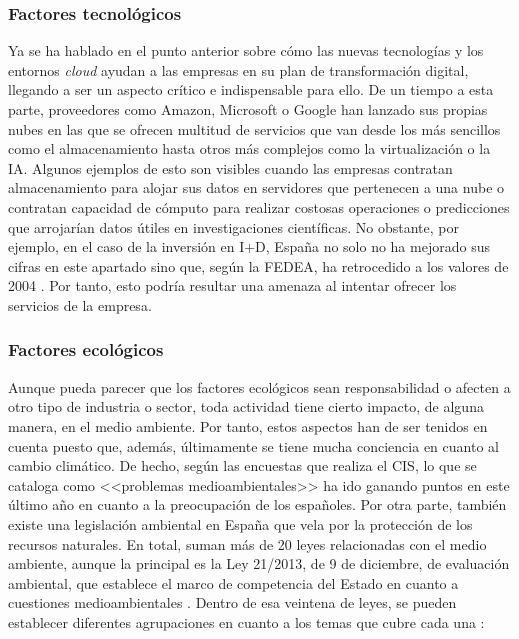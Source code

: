 \clearpage

\subsubsection{Factores tecnológicos}
Ya se ha hablado en el punto anterior sobre cómo las nuevas tecnologías y los entornos \textit{cloud} ayudan a las empresas en su plan de transformación digital, llegando a ser un aspecto crítico e indispensable para ello. De un tiempo a esta parte, proveedores como Amazon, Microsoft o Google han lanzado sus propias nubes en las que se ofrecen multitud de servicios que van desde los más sencillos como el almacenamiento hasta otros más complejos como la virtualización o la \acf{IA}. Algunos ejemplos de esto son visibles cuando las empresas contratan almacenamiento para alojar sus datos en servidores que pertenecen a una nube o contratan capacidad de cómputo para realizar costosas operaciones o predicciones que arrojarían datos útiles en investigaciones científicas. No obstante, por ejemplo, en el caso de la inversión en I+D, España no solo no ha mejorado sus cifras en este apartado sino que, según la \acf{FEDEA}, ha retrocedido a los valores de 2004 \cite{robertolopezvargas2019}. Por tanto, esto podría resultar una amenaza al intentar ofrecer los servicios de la empresa.

\subsubsection{Factores ecológicos}
Aunque pueda parecer que los factores ecológicos sean responsabilidad o afecten a otro tipo de industria o sector, toda actividad tiene cierto impacto, de alguna manera, en el medio ambiente. Por tanto, estos aspectos han de ser tenidos en cuenta puesto que, además, últimamente se tiene mucha conciencia en cuanto al cambio climático. De hecho, según las encuestas que realiza el \acf{CIS}, lo que se cataloga como <<problemas medioambientales>> ha ido ganando puntos en este último año en cuanto a la preocupación de los españoles. Por otra parte, también existe una legislación ambiental en España que vela por la protección de los recursos naturales. En total, suman más de 20 leyes relacionadas con el medio ambiente, aunque la principal es la Ley 21/2013, de 9 de diciembre, de evaluación ambiental, que establece el marco de competencia del Estado en cuanto a cuestiones medioambientales \cite{boemedioamb}. Dentro de esa veintena de leyes, se pueden establecer diferentes agrupaciones en cuanto a los temas que cubre cada una \cite{ceremcomunicacion2018}: 

